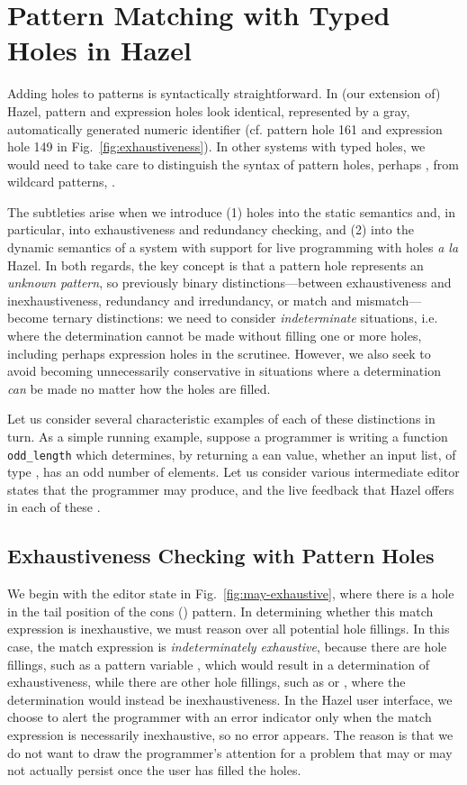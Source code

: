 \section{Pattern Matching with Typed Holes in Hazel}\label{sec:examples}
Adding holes to patterns is syntactically straightforward. In (our extension of) Hazel, pattern and expression holes look identical, represented by a gray, automatically generated numeric identifier (cf. pattern hole 161 and expression hole 149 in Fig.~\ref{fig:exhaustiveness}). In other systems with typed holes, we would need to take care to distinguish the syntax of pattern holes, perhaps , from wildcard patterns, \li{_}.

The subtleties arise when we introduce  (1) holes into the static semantics and, in particular, into exhaustiveness and redundancy checking, and (2) into the dynamic semantics of a system with support for live programming with holes \emph{a la} Hazel. In both regards, the key concept is that a pattern hole represents an \emph{unknown  pattern}, so previously binary distinctions---between exhaustiveness and inexhaustiveness, redundancy and irredundancy, or match and mismatch---become ternary distinctions: we need to consider \emph{indeterminate} situations, i.e. where the determination cannot be made without filling one or more holes, including perhaps expression holes in the scrutinee. However, we also seek to avoid becoming unnecessarily conservative in situations where a determination \emph{can} be made no matter how the holes are filled.

Let us consider several characteristic examples of each of these distinctions in turn. As a simple running example, suppose a programmer is writing a function \texttt{odd\_length} which determines, by returning a ean value, whether an input list, of type \li{[Int]}, has an odd number of elements. Let us consider
various intermediate editor states that the programmer may produce, and the live feedback that Hazel offers in each of these \cite{Potter2020HazelTG}.

\subsection{Exhaustiveness Checking with Pattern Holes}
\label{sec:hazel-exhaustiveness}
We begin with the editor state in Fig.~\ref{fig:may-exhaustive}, 
where there is a hole in the tail position of the cons (\li{::}) pattern.
In determining whether this match expression is inexhaustive, we 
must reason over all potential hole fillings. In this case, the 
match expression is \emph{indeterminately exhaustive}, because there are hole fillings,
such as a pattern variable , which would result in a determination
of exhaustiveness, while there are other hole fillings, such as \li{[]} or ,
where the determination would instead be inexhaustiveness. In the Hazel user interface, we choose to alert the programmer with an error
indicator only when the match expression is necessarily inexhaustive,
so no error appears. The reason is that we do not want to draw the programmer's attention for a problem that may or may not actually persist once the user has filled the holes.

